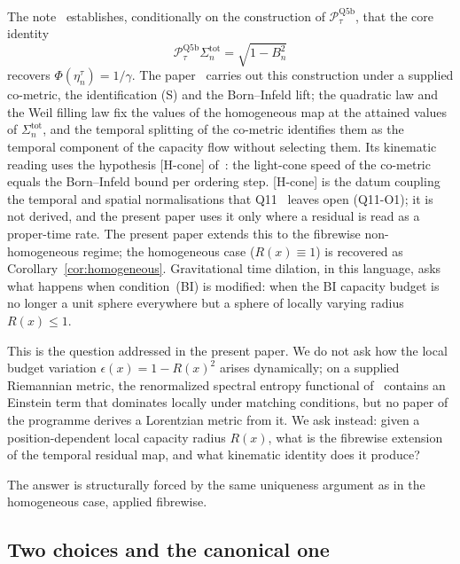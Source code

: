 \documentclass[11pt,a4paper]{article}
\begin{document}
      The note~\cite{Beau2026n} establishes, conditionally on the construction of
      $\mathcal{P}_\tau^{\mathrm{Q5b}}$, that the core identity
      \begin{equation}\label{eq:flat}
        \mathcal{P}_\tau^{\mathrm{Q5b}}\Sigma_n^{\mathrm{tot}} = \sqrt{1-B_n^2}
      \end{equation}
      recovers $\Phi(\eta_n^\tau) = 1/\gamma$.
      The paper~\cite{Beau2026tp} carries out this construction under a supplied co-metric, the identification
      (S) and the Born--Infeld lift; the quadratic law and the Weil filling law fix the values of the homogeneous
      map at the attained values of $\Sigma_n^{\mathrm{tot}}$, and the temporal splitting of the co-metric
      identifies them as the temporal component of the capacity flow without selecting them.
      Its kinematic reading uses the hypothesis [H-cone] of~\cite{Beau2026tp}: the light-cone speed of the
      co-metric equals the Born--Infeld bound per ordering step.
      [H-cone] is the datum coupling the temporal and spatial normalisations that Q11~\cite{Beau2026q11} leaves
      open (Q11-O1); it is not derived, and the present paper uses it only where a residual is read as a
      proper-time rate.
      The present paper extends this to the fibrewise non-homogeneous regime;
      the homogeneous case ($R(x)\equiv 1$) is recovered as
      Corollary~\ref{cor:homogeneous}.
      Gravitational time dilation, in this language, asks what happens when condition~(BI)
      is modified: when the BI capacity budget is no longer a unit sphere everywhere but
      a sphere of locally varying radius $R(x) \leq 1$.

      This is the question addressed in the present paper.
      We do not ask how the local budget variation $\epsilon(x) = 1-R(x)^2$ arises dynamically;
      on a supplied Riemannian metric, the renormalized spectral entropy functional of~\cite{Beau2026h}
      contains an Einstein term that dominates locally under matching conditions, but no paper of the programme
      derives a Lorentzian metric from it.
      We ask instead: given a position-dependent local capacity radius $R(x)$, what is
      the fibrewise extension of the temporal residual map, and what kinematic identity
      does it produce?

      The answer is structurally forced by the same uniqueness argument as in the homogeneous
      case, applied fibrewise.

    \subsection{Two choices and the canonical one}
\end{document}

